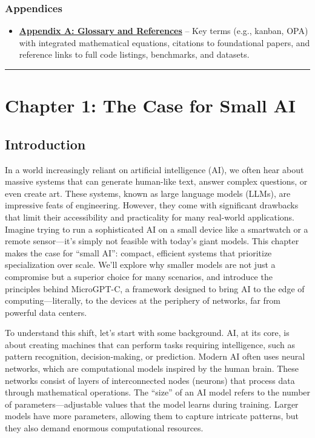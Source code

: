 \documentclass[
]{article}
\providecommand{\tightlist}{%
  \setlength{\itemsep}{0pt}\setlength{\parskip}{0pt}}
\begin{document}
\subsubsection{Appendices}\label{appendices}

\begin{itemize}
\tightlist
\item
  \textbf{\href{A.md}{Appendix A: Glossary and References}} -- Key terms
  (e.g., kanban, OPA) with integrated mathematical equations, citations
  to foundational papers, and reference links to full code listings,
  benchmarks, and datasets.
\end{itemize}

\begin{center}\rule{0.5\linewidth}{0.5pt}\end{center}

\section{Chapter 1: The Case for Small
AI}\label{chapter-1-the-case-for-small-ai}

\subsection{Introduction}\label{introduction}

In a world increasingly reliant on artificial intelligence (AI), we
often hear about massive systems that can generate human-like text,
answer complex questions, or even create art. These systems, known as
large language models (LLMs), are impressive feats of engineering.
However, they come with significant drawbacks that limit their
accessibility and practicality for many real-world applications. Imagine
trying to run a sophisticated AI on a small device like a smartwatch or
a remote sensor---it's simply not feasible with today's giant models.
This chapter makes the case for ``small AI'': compact, efficient systems
that prioritize specialization over scale. We'll explore why smaller
models are not just a compromise but a superior choice for many
scenarios, and introduce the principles behind MicroGPT-C, a framework
designed to bring AI to the edge of computing---literally, to the
devices at the periphery of networks, far from powerful data centers.

To understand this shift, let's start with some background. AI, at its
core, is about creating machines that can perform tasks requiring
intelligence, such as pattern recognition, decision-making, or
prediction. Modern AI often uses neural networks, which are
computational models inspired by the human brain. These networks consist
of layers of interconnected nodes (neurons) that process data through
mathematical operations. The ``size'' of an AI model refers to the
number of parameters---adjustable values that the model learns during
training. Larger models have more parameters, allowing them to capture
intricate patterns, but they also demand enormous computational
resources.
\end{document}
